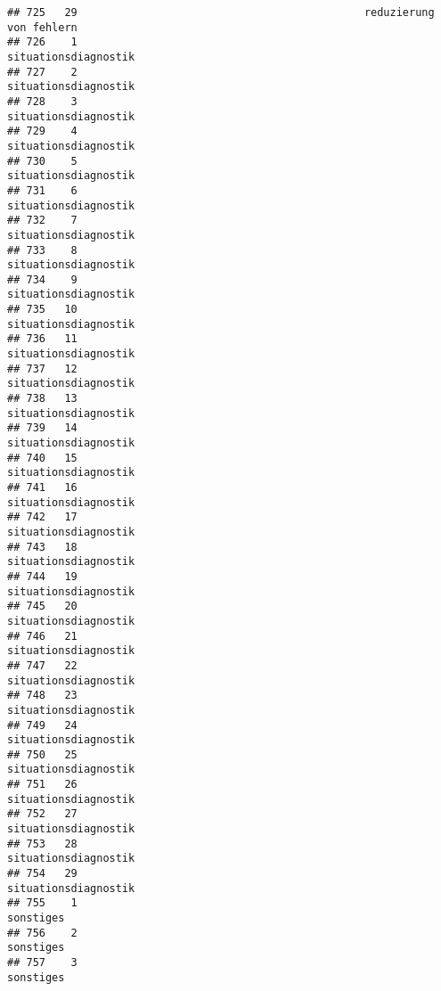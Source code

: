 \documentclass[
]{article}
\begin{document}
\begin{verbatim}
## 725   29                                             reduzierung von fehlern
## 726    1                                                situationsdiagnostik
## 727    2                                                situationsdiagnostik
## 728    3                                                situationsdiagnostik
## 729    4                                                situationsdiagnostik
## 730    5                                                situationsdiagnostik
## 731    6                                                situationsdiagnostik
## 732    7                                                situationsdiagnostik
## 733    8                                                situationsdiagnostik
## 734    9                                                situationsdiagnostik
## 735   10                                                situationsdiagnostik
## 736   11                                                situationsdiagnostik
## 737   12                                                situationsdiagnostik
## 738   13                                                situationsdiagnostik
## 739   14                                                situationsdiagnostik
## 740   15                                                situationsdiagnostik
## 741   16                                                situationsdiagnostik
## 742   17                                                situationsdiagnostik
## 743   18                                                situationsdiagnostik
## 744   19                                                situationsdiagnostik
## 745   20                                                situationsdiagnostik
## 746   21                                                situationsdiagnostik
## 747   22                                                situationsdiagnostik
## 748   23                                                situationsdiagnostik
## 749   24                                                situationsdiagnostik
## 750   25                                                situationsdiagnostik
## 751   26                                                situationsdiagnostik
## 752   27                                                situationsdiagnostik
## 753   28                                                situationsdiagnostik
## 754   29                                                situationsdiagnostik
## 755    1                                                           sonstiges
## 756    2                                                           sonstiges
## 757    3                                                           sonstiges

\end{verbatim}
\end{document}
